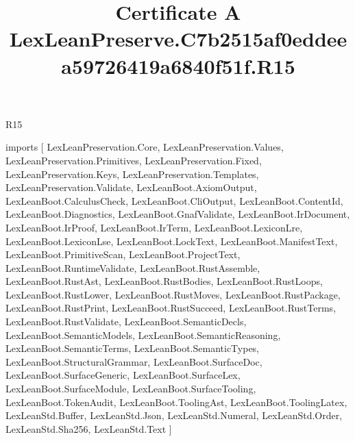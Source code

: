 \begin{lexlean}{R15}
\title{Certificate A LexLeanPreserve.C7b2515af0eddeea59726419a6840f51f.R15}
\begin{coremodule}
imports [
  LexLeanPreservation.Core,
  LexLeanPreservation.Values,
  LexLeanPreservation.Primitives,
  LexLeanPreservation.Fixed,
  LexLeanPreservation.Keys,
  LexLeanPreservation.Templates,
  LexLeanPreservation.Validate,
  LexLeanBoot.AxiomOutput,
  LexLeanBoot.CalculusCheck,
  LexLeanBoot.CliOutput,
  LexLeanBoot.ContentId,
  LexLeanBoot.Diagnostics,
  LexLeanBoot.GnafValidate,
  LexLeanBoot.IrDocument,
  LexLeanBoot.IrProof,
  LexLeanBoot.IrTerm,
  LexLeanBoot.LexiconLre,
  LexLeanBoot.LexiconLse,
  LexLeanBoot.LockText,
  LexLeanBoot.ManifestText,
  LexLeanBoot.PrimitiveScan,
  LexLeanBoot.ProjectText,
  LexLeanBoot.RuntimeValidate,
  LexLeanBoot.RustAssemble,
  LexLeanBoot.RustAst,
  LexLeanBoot.RustBodies,
  LexLeanBoot.RustLoops,
  LexLeanBoot.RustLower,
  LexLeanBoot.RustMoves,
  LexLeanBoot.RustPackage,
  LexLeanBoot.RustPrint,
  LexLeanBoot.RustSucceed,
  LexLeanBoot.RustTerms,
  LexLeanBoot.RustValidate,
  LexLeanBoot.SemanticDecls,
  LexLeanBoot.SemanticModels,
  LexLeanBoot.SemanticReasoning,
  LexLeanBoot.SemanticTerms,
  LexLeanBoot.SemanticTypes,
  LexLeanBoot.StructuralGrammar,
  LexLeanBoot.SurfaceDoc,
  LexLeanBoot.SurfaceGeneric,
  LexLeanBoot.SurfaceLex,
  LexLeanBoot.SurfaceModule,
  LexLeanBoot.SurfaceTooling,
  LexLeanBoot.TokenAudit,
  LexLeanBoot.ToolingAst,
  LexLeanBoot.ToolingLatex,
  LexLeanStd.Buffer,
  LexLeanStd.Json,
  LexLeanStd.Numeral,
  LexLeanStd.Order,
  LexLeanStd.Sha256,
  LexLeanStd.Text
]


\end{coremodule}
\end{lexlean}
